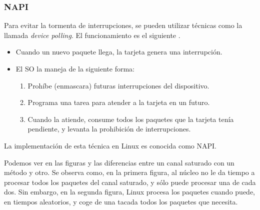 \subsubsection{NAPI}
Para evitar la tormenta de interrupciones, se pueden utilizar técnicas como la llamada \emph{device polling}. El 
funcionamiento es el siguiente \cite{beyondDevicePolling}.
\begin{itemize}
 \item Cuando un nuevo paquete llega, la tarjeta genera una interrupción.
 \item El \gls{SO} la maneja de la siguiente forma:
 \begin{enumerate}
  \item Prohíbe (enmascara) futuras interrupciones del dispositivo.
  \item Programa una tarea para atender a la tarjeta en un futuro.
  \item Cuando la atiende, consume todos los paquetes que la tarjeta tenía pendiente, y levanta la prohibición de 
interrupciones.
 \end{enumerate}
\end{itemize}

La implementación de esta técnica en Linux es conocida como \gls{NAPI}.

Podemos ver en las figuras  y  las diferencias entre un canal saturado 
con un método y otro. Se observa como, en la primera figura, al núcleo no le da tiempo a procesar todos los paquetes 
del canal saturado, y sólo puede procesar una de cada dos. Sin embargo, en la segunda figura, Linux procesa los 
paquetes cuando puede, en tiempos aleatorios, y coge de una tacada todos los paquetes que necesita.

